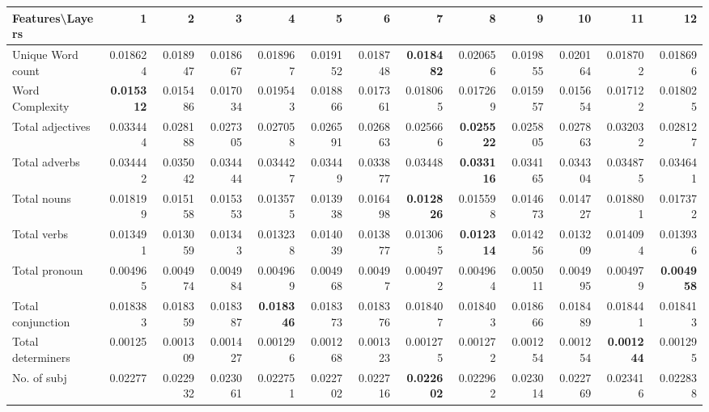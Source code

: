 \documentclass[sigconf]{acmart}
\begin{document}
\begin{table*}[]
\begin{adjustbox}{width=1\textwidth}
\begin{tabular}{@{}l|rrrrrrrrrrrr@{}}
\toprule
\textbf{Features\textbackslash{}Layers} & 1 & 2 & 3 & 4 & 5 & 6 & 7 & 8 & 9 & 10 & 11 & 12 \\ \midrule
Unique Word count & 0.018624 & 0.018947 & 0.018667 & 0.018967 & 0.019152 & 0.018748 & \textbf{0.018482} & 0.020656 & 0.019855 & 0.020164 & 0.018702 & 0.018696 \\
Word Complexity & \textbf{0.015312} & 0.015486 & 0.017034 & 0.019543 & 0.018866 & 0.017361 & 0.018065 & 0.017269 & 0.015957 & 0.015654 & 0.017122 & 0.018025\\
Total adjectives                        & 0.033444 & 0.028188 & 0.027305 & 0.027058          & 0.026591 & 0.026863 & 0.025666          & \textbf{0.025522} & 0.025805 & 0.027863 & 0.032032          & 0.028127          \\
Total adverbs                           & 0.034442 & 0.035042 & 0.034444 & 0.034427          & 0.03449  & 0.033877 & 0.03448           & \textbf{0.033116} & 0.034165 & 0.034304 & 0.034875          & 0.034641          \\
Total nouns                             & 0.018199 & 0.015158 & 0.015353 & 0.013575          & 0.013938 & 0.016498 & \textbf{0.012826} & 0.015598          & 0.014673 & 0.014727 & 0.018801          & 0.017372          \\
Total verbs                             & 0.013491 & 0.013059 & 0.01343  & 0.013238          & 0.014039 & 0.013877 & 0.013065          & \textbf{0.012314} & 0.014256 & 0.013209 & 0.014094          & 0.013936          \\
Total pronoun                           & 0.004965 & 0.004974 & 0.004984 & 0.004969          & 0.004968 & 0.00497  & 0.004972          & 0.004964          & 0.005011 & 0.004995 & 0.004979          & \textbf{0.004958} \\
Total conjunction                       & 0.018383 & 0.018359 & 0.018387 & \textbf{0.018346} & 0.018373 & 0.018376 & 0.018407          & 0.018403          & 0.018666 & 0.018489 & 0.018441          & 0.018413          \\
Total determiners                       & 0.00125  & 0.001309 & 0.001427 & 0.001296          & 0.001268 & 0.001323 & 0.001275          & 0.001272          & 0.001254 & 0.001254 & \textbf{0.001244} & 0.001295          \\
No. of subj                             & 0.02277  & 0.022932 & 0.023061 & 0.022751          & 0.022702 & 0.022716 & \textbf{0.022602} & 0.022962          & 0.023014 & 0.022769 & 0.023416          & 0.022838          \\

\end{tabular}
\end{adjustbox}
\end{table*}
\end{document}
